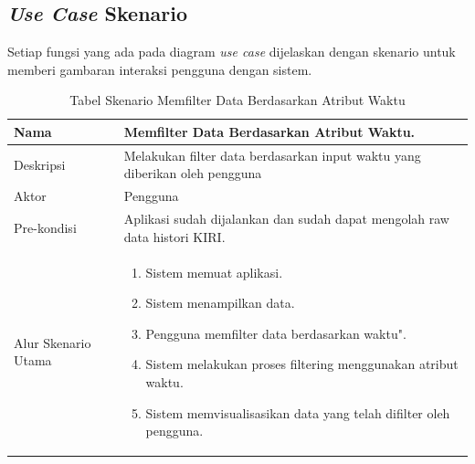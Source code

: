 \subsection{\textit{Use Case} Skenario}
Setiap fungsi yang ada pada diagram \textit{use case} dijelaskan dengan skenario untuk memberi gambaran interaksi pengguna dengan sistem.
\begin{table}[H]
    \centering
    \caption{Tabel Skenario Memfilter Data Berdasarkan Atribut Waktu}
    \begin{tabular}{|p{3cm}|p{10cm}|}
    \hline
        Nama & Memfilter Data Berdasarkan Atribut Waktu.\\
    \hline
    \hline
        Deskripsi & Melakukan filter data berdasarkan input waktu yang diberikan oleh pengguna \\
    \hline
        Aktor & Pengguna \\
    \hline
        Pre-kondisi & Aplikasi sudah dijalankan dan sudah dapat mengolah raw data histori KIRI.\\
    \hline
        Alur Skenario Utama & 
        \begin{enumerate}
            \item Sistem memuat aplikasi.
            \item Sistem menampilkan data.
            \item Pengguna memfilter data berdasarkan waktu".
            \item Sistem melakukan proses filtering menggunakan atribut waktu.
            \item Sistem memvisualisasikan data yang telah difilter oleh pengguna.
        \end{enumerate}\\
    \hline
    \end{tabular}
    \label{tab:skenario1}
\end{table}

